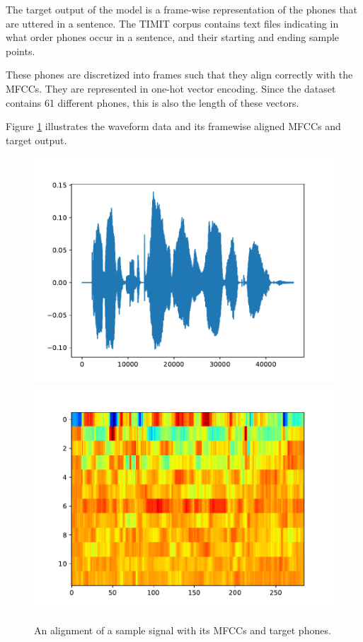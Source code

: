 			The target output of the model is a frame-wise representation of the phones that are uttered in a sentence.
			The TIMIT corpus contains text files indicating in what order phones occur in a sentence, and their starting and ending sample points.

			These phones are discretized into frames such that they align correctly with the MFCCs.
			They are represented in one-hot vector encoding.
			Since the dataset contains 61 different phones, this is also the length of these vectors.

			Figure \ref{fig:source_mfcc_target} illustrates the waveform data and its framewise aligned MFCCs and target output.




		\begin{figure}[ht]
		    \centering
		    \includegraphics[width=.45\linewidth]{gfx/signal}\\
		    \includegraphics[width=.45\linewidth]{gfx/mfcc}\\
		    \label{fig:source_mfcc_target}
		    \caption{An alignment of a sample signal with its MFCCs and target phones.}
		\end{figure}


